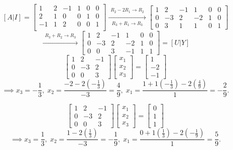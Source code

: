 \begin{solution}[5.0cm]
\[
[A|I]=
\left[\begin{array}{ccc|ccc}
1 & 2 & -1 & 1 & 0 & 0\\
2 & 1 & 0 & 0 & 1 & 0\\
-1 & 1 & 2 & 0 & 0 & 1\\
\end{array}\right]
\xrightarrow[
{\displaystyle
\begin{array}{l}
R_3+R_1\to R_3
\end{array}}]
{{\displaystyle
\begin{array}{l}
R_2-2R_1\to R_2
\end{array}}
}
\left[\begin{array}{ccc|ccc}
1 & 2 & -1 & 1 & 0 & 0\\
0 & -3 & 2 & -2 & 1 & 0\\
0 & 3 & 1 & 1 & 0 & 1
\end{array}\right]
\]
\[
\xrightarrow{\begin{array}{l}\displaystyle{R_3+R_2\to R_3}\end{array}}
\left[\begin{array}{ccc|ccc}
1 & 2 & -1 & 1 & 0 & 0 \\
0 & -3 & 2 & -2 & 1 & 0\\
0 & 0 & 3 & -1 & 1 & 1
\end{array}\right]=[U|Y]
\]
\medskip
\[
\begin{bmatrix}
1 & 2 & -1\\
0 & -3 & 2\\
0 & 0 & 3
\end{bmatrix}
\begin{bmatrix}
x_1 \\ x_2 \\ x_3
\end{bmatrix}
=
\begin{bmatrix}
1 \\ -2 \\ -1
\end{bmatrix}
\]
\[
\implies
x_3 = -\frac13, \; x_2 = \frac{-2-2(-\frac13)}{-3} = \frac49, \; x_1 = \frac{1+1(-\frac13)-2(\frac49)}{1}=-\frac29.
\]

\medskip

\[
\begin{bmatrix}
1 & 2 & -1\\
0 & -3 & 2\\
0 & 0 & 3
\end{bmatrix}
\begin{bmatrix}
x_1 \\ x_2 \\ x_3
\end{bmatrix}
=
\begin{bmatrix}
0 \\ 1 \\ 1
\end{bmatrix}
\]
\[
\implies
x_3 = \frac13, \; x_2 = \frac{1-2(\frac13)}{-3} = -\frac19, \; x_1 = \frac{0+1(\frac13)-2(-\frac19)}{1}=\frac59.
\]


\end{solution}
